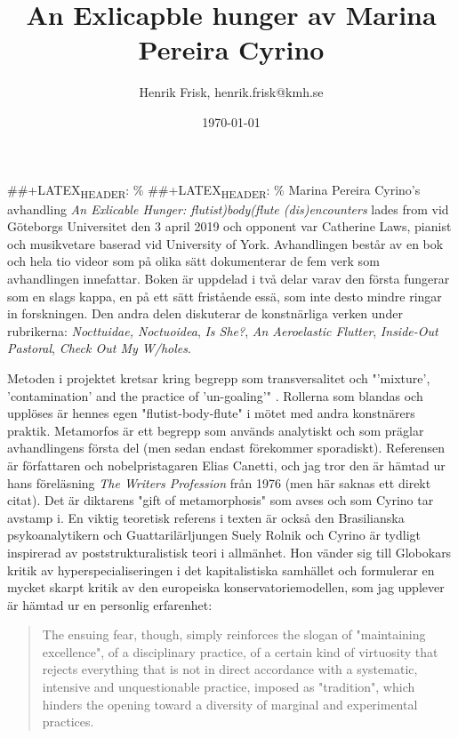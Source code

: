 \documentclass[11pt]{article}
\author{Henrik Frisk, henrik.frisk@kmh.se}
\date{\today}
\title{An Exlicapble hunger av Marina Pereira Cyrino}
\begin{document}
\maketitle
\#\#+LATEX\textsubscript{HEADER}: \renewcommand*{\nameyeardelim}{\space}\%
\#\#+LATEX\textsubscript{HEADER}: \renewcommand{\postnotedelim}{: }\%
Marina Pereira Cyrino's avhandling \emph{An Exlicable Hunger: flutist)body(flute (dis)encounters} lades from vid Göteborgs Universitet den 3 april 2019 och opponent var Catherine Laws, pianist och musikvetare baserad vid University of York. Avhandlingen består av en bok och hela tio videor som på olika sätt dokumenterar de fem verk som avhandlingen innefattar. Boken är uppdelad i två delar varav den första fungerar som en slags kappa, en på ett sätt fristående essä, som inte desto mindre ringar in forskningen. Den andra delen diskuterar de konstnärliga verken under rubrikerna: \emph{Nocttuidae, Noctuoidea}, \emph{Is She?}, \emph{An Aeroelastic Flutter}, \emph{Inside-Out Pastoral}, \emph{Check Out My W/holes}.

Metoden i projektet kretsar kring begrepp som transversalitet och "'mixture', 'contamination' and the practice
of 'un-goaling'" \citep[s. 7 (abstract)]{Cyrino2019}. Rollerna som blandas och upplöses är hennes egen "flutist-body-flute" i mötet med andra konstnärers praktik. Metamorfos är ett begrepp som används analytiskt och som präglar avhandlingens första del (men sedan endast förekommer sporadiskt). Referensen är författaren och nobelpristagaren Elias Canetti, och jag tror den är hämtad ur hans föreläsning \emph{The Writers Profession} från 1976 (men här saknas ett direkt citat). Det är diktarens "gift of metamorphosis" som avses och som Cyrino tar avstamp i. En viktig teoretisk referens i texten är också den Brasilianska psykoanalytikern och Guattarilärljungen Suely Rolnik och Cyrino är tydligt inspirerad av poststrukturalistisk teori i allmänhet. Hon vänder sig till Globokars kritik av hyperspecialiseringen i det kapitalistiska samhället och formulerar en mycket skarpt kritik av den europeiska konservatoriemodellen, som jag upplever är hämtad ur en personlig erfarenhet:

\begin{quote}
The ensuing fear, though, simply reinforces the slogan of
"maintaining excellence", of a disciplinary practice, of a certain
kind of virtuosity that rejects everything that is not in direct
accordance with a systematic, intensive and unquestionable
practice, imposed as "tradition", which hinders the opening
toward a diversity of marginal and experimental practices. \citep[s. 23]{Cyrino2019}
\end{quote}
\end{document}
